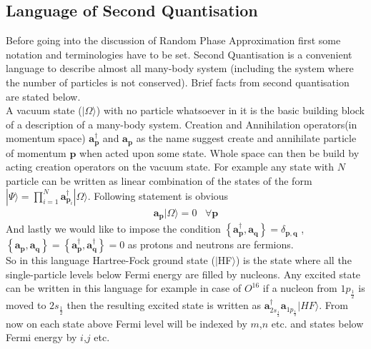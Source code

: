 \documentclass[a4paper]{paper}
\begin{document}
        \subsection{Language of Second Quantisation}
            Before going into the discussion of Random Phase Approximation first some notation and terminologies have to be set. Second Quantisation is a convenient language to describe almost all many-body system (including the system where the number of particles is not conserved). Brief facts from second quantisation are stated below.\\
            A vacuum state ($|\Omega\rangle$) with no particle whatsoever in it is the basic building block of a description of a many-body system. Creation and Annihilation operators(in momentum space) $\mathbf{a}^{\dagger}_{\mathbf{p}}$ and $\mathbf{a_{\mathbf{p}}}$ as the name suggest create and annihilate particle of momentum $\mathbf{p}$ when acted upon some state. Whole space can then be build by acting creation operators on the vacuum state. For example any state with $N$ particle can be written as linear combination of the states of the form $|\Psi\rangle = \prod_{i=1}^{N} \mathbf{a}_{\mathbf{p}_i}^{\dagger}|\Omega\rangle $. Following statement is obvious
            \begin{eqnarray}
                \mathbf{a}_{\mathbf{p}}|\Omega\rangle = 0 \hspace{10pt} \forall \mathbf{p} 
            \end{eqnarray}
            And lastly we would like to impose the condition $\left\{\mathbf{a}_{\mathbf{p}}^{\dagger},\mathbf{a}_{\mathbf{q}}\right\} = \delta_{\mathbf{p},\mathbf{q}}$ , $\left\{\mathbf{a}_{\mathbf{p}},\mathbf{a}_{\mathbf{q}}\right\} = \left\{\mathbf{a}_{\mathbf{p}}^{\dagger},\mathbf{a}_{\mathbf{q}}^{\dagger}\right\} = 0$ as protons and neutrons are fermions.\\
            So in this language Hartree-Fock ground state ($|$HF$\rangle$) is the state where all the single-particle levels below Fermi energy are filled by nucleons. Any excited state can be written in this language for example in case of $O^{16}$ if a nucleon from $1p_{\frac{1}{2}}$ is moved to $2s_{\frac{1}{2}}$ then the resulting excited state is written as $\mathbf{a}_{2s_{\frac{1}{2}}}^{\dagger}\mathbf{a}_{1p_{\frac{1}{2}}}|HF\rangle$. From now on each state above Fermi level will be indexed by $m$,$n$ etc. and states below Fermi energy by $i$,$j$ etc.
\end{document}
